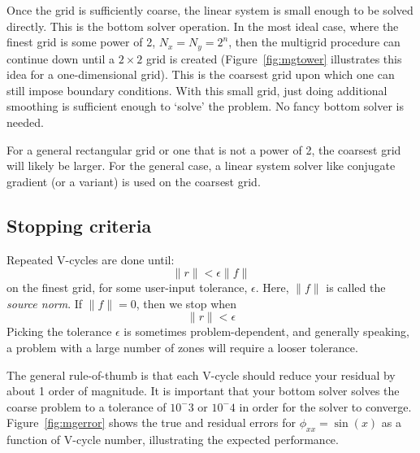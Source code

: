 Once the grid is sufficiently coarse, the linear system is small
enough to be solved directly.  This is the bottom solver operation.
In the most ideal case, where the finest grid is some power of 2, $N_x
= N_y = 2^n$, then the multigrid procedure can continue down until a
$2\times 2$ grid is created (Figure~\ref{fig:mgtower} illustrates this idea
for a one-dimensional grid).  This is the coarsest grid upon which one
can still impose boundary conditions.  With this small grid, just
doing additional smoothing is sufficient enough to `solve' the
problem.  No fancy bottom solver is needed.

For a general rectangular grid or one that is not a power of 2, the
coarsest grid will likely be larger.  For the general case, a linear
system solver like conjugate gradient (or a variant) is used on the
coarsest grid.

\subsection{Stopping criteria}

Repeated V-cycles are done until:
\begin{equation}
\| r \| < \epsilon \|f\|
\end{equation}
on the finest grid, for some user-input tolerance, $\epsilon$.  Here,
$\|f\|$ is called the {\em source norm}.  If $\|f\| = 0$, then we stop
when
\begin{equation}
\| r \| < \epsilon 
\end{equation}
Picking the tolerance $\epsilon$ is sometimes problem-dependent, and
generally speaking, a problem with a large number of zones will require
a looser tolerance.

The general rule-of-thumb is that each V-cycle should reduce your
residual by about 1 order of magnitude.  It is important that your
bottom solver solves the coarse problem to a tolerance of $10^-3$ or
$10^-4$ in order for the solver to converge.  Figure~\ref{fig:mgerror}
shows the true and residual errors for $\phi_{xx} = \sin(x)$ as a function
of V-cycle number, illustrating the expected performance.

